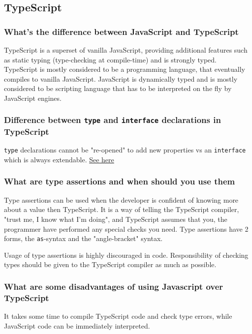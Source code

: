 \documentclass[12pt, a4paper]{article}
\newcommand{\code}[1]{\texttt{#1}}
\begin{document}
\pagebreak

\subsection*{TypeScript}


\subsubsection*{What's the difference between JavaScript and TypeScript}
TypeScript is a superset of vanilla JavaScript, providing additional features such as static typing (type-checking at compile-time) and is strongly typed.
TypeScript is mostly considered to be a programming language, that eventually compiles to vanilla JavaScript.\newline
JavaScript is dynamically typed and is mostly considered to be scripting language that has to be interpreted on the fly by JavaScript engines.

\subsubsection*{Difference between \code{type} and \code{interface} declarations in TypeScript}
\code{type} declarations cannot be "re-opened" to add new properties vs an \code{interface} which is always extendable.
\href{https://www.typescriptlang.org/docs/handbook/2/everyday-types.html#differences-between-type-aliases-and-interfaces}{See here}

\subsubsection*{What are type assertions and when should you use them}
Type assertions can be used when the developer is confident of knowing more about a value then TypeScript.
It is a way of telling the TypeScript compiler, "trust me, I know what I'm doing", and TypeScript assumes that you, the programmer have performed any special checks you need.
Type assertions have 2 forms, the \code{as}-syntax and the "angle-bracket" syntax.

Usage of type assertions is highly discouraged in code.
Responsibility of checking types should be given to the TypeScript compiler as much as possible.

\subsubsection*{What are some disadvantages of using Javascript over TypeScript}
It takes some time to compile TypeScript code and check type errors, while JavaScript code can be immediately interpreted.
\end{document}
